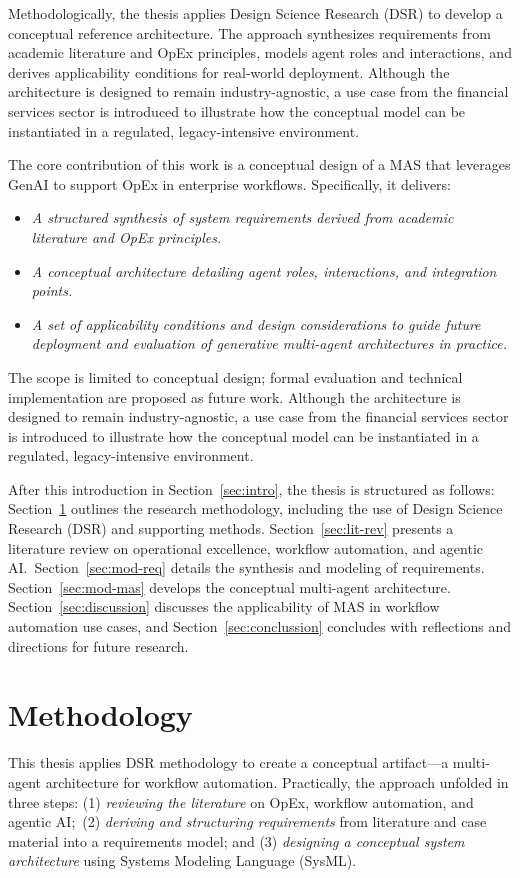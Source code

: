 Methodologically, the thesis applies Design Science Research (DSR) to develop a conceptual reference architecture. The approach synthesizes requirements from academic literature and OpEx principles, models agent roles and interactions, and derives applicability conditions for real-world deployment.
Although the architecture is designed to remain industry-agnostic, a use case from the financial services sector is introduced to illustrate how the conceptual model can be instantiated in a regulated, legacy-intensive environment.

The core contribution of this work is a conceptual design of a MAS that leverages GenAI to support OpEx in enterprise workflows. Specifically, it delivers:
\begin{itemize}
    \item \emph{A structured synthesis of system requirements derived from academic literature and OpEx principles.}
    \item \emph{A conceptual architecture detailing agent roles, interactions, and integration points.}
    \item \emph{A set of applicability conditions and design considerations to guide future deployment and evaluation of generative multi-agent architectures in practice.}
\end{itemize}

The scope is limited to conceptual design; formal evaluation and technical implementation are proposed as future work. Although the architecture is designed to remain industry-agnostic, a use case from the financial services sector is introduced to illustrate how the conceptual model can be instantiated in a regulated, legacy-intensive environment.

After this introduction in Section~\ref{sec:intro}, the thesis is structured as follows: Section~\ref{sec:method} outlines the research methodology, including the use of Design Science Research (DSR) and supporting methods. Section~\ref{sec:lit-rev} presents a literature review on operational excellence, workflow automation, and agentic AI.~Section~\ref{sec:mod-req} details the synthesis and modeling of requirements. Section~\ref{sec:mod-mas} develops the conceptual multi-agent architecture. Section~\ref{sec:discussion} discusses the applicability of MAS in workflow automation use cases, and Section~\ref{sec:conclussion} concludes with reflections and directions for future research.

\section{Methodology}\label{sec:method}
This thesis applies DSR methodology to create a conceptual artifact---a multi-agent architecture for workflow automation. Practically, the approach unfolded in three steps: (1) \emph{reviewing the literature} on OpEx, workflow automation, and agentic AI;~(2) \emph{deriving and structuring requirements} from literature and case material into a requirements model; and (3) \emph{designing a conceptual system architecture} using Systems Modeling Language (SysML).

